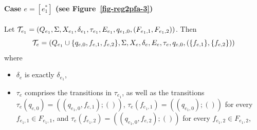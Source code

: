 
\paragraph{Case $e = [e_1^{\ast}]$ (see Figure~\ref{fig-reg2pfa-3})} 
Let $\mathcal{T}_{e_1} = (Q_{e_1}, \Sigma, X_{e_1}, \delta_{e_1}, \tau_{e_1}, E_{e_1}, q_{e_1,0}, (F_{e_1,1}, F_{e_1,2}))$. Then
\[ \mathcal{T}_e = (Q_{e_1} \cup \{q_{e,0}, f_{e,1}, f_{e,2}\}, \Sigma, X_{e}, \delta_e, E_{e}, \tau_e, q_{e,0}, (\{f_{e,1}\}, \{f_{e,2}\}))\] where 
		\begin{itemize}
			
			\item $\delta_e$ is exactly $\delta_{e_1}$,
%
			\item $\tau_e$ comprises the transitions in $\tau_{e_1}$,  as well as the transitions $\tau_e(q_{e,0}) = ((q_{e_1,0}, f_{e,1}); ())$,  $\tau_e(f_{e_1,1}) = ((q_{e_1,0});())$ for every $f_{e_1,1} \in F_{e_1,1}$, and $\tau_e(f_{e_1,2}) = ((q_{e_1,0}, f_{e,2});())$ for every $f_{e_1,2} \in F_{e_1,2}$, 

\end{itemize}
